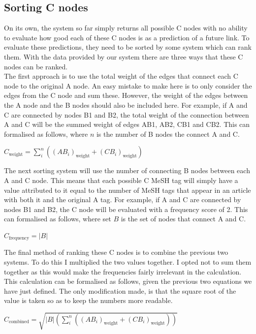 \documentclass{l4proj}
\begin{document}
\subsection{Sorting C nodes}

On its own, the system so far simply returns all possible C nodes with no ability to evaluate how good each of these C nodes is as a prediction of a future link. To evaluate these predictions, they need to be sorted by some system which can rank them. With the data provided by our system there are three ways that these C nodes can be ranked. \\

The first approach is to use the total weight of the edges that connect each C node to the original A node. An easy mistake to make here is to only consider the edges from the C node and sum these. However, the weight of the edges between the A node and the B nodes should also be included here. For example, if A and C are connected by nodes B1 and B2, the total weight of the connection between A and C will be the summed weight of edges AB1, AB2, CB1 and CB2. This can formalised as follows, where $n$ is the number of B nodes the connect A and C.
\begin{center}
    $C_{\text{weight}} = \sum_i^n ((AB_i)_{\text{weight}} + (CB_i)_{\text{weight}})$ \\
\end{center}

The next sorting system will use the number of connecting B nodes between each A and C node. This means that each possible C MeSH tag will simply have a value attributed to it equal to the number of MeSH tags that appear in an article with both it and the original A tag. For example, if A and C are connected by nodes B1 and B2, the C node will be evaluated with a frequency score of 2. This can formalised as follows, where set $B$ is the set of nodes that connect A and C.
\begin{center}
    $C_{\text{frequency}} = |B| $\\
\end{center}

The final method of ranking these C nodes is to combine the previous two systems. To do this I multiplied the two values together. I opted not to sum them together as this would make the frequencies fairly irrelevant in the calculation. This calculation can be formalised as follows, given the previous two equations we have just defined. The only modification made, is that the square root of the value is taken so as to keep the numbers more readable.
\begin{center}
    $C_{\text{combined}} = \sqrt{|B|(\sum_i^n ((AB_i)_{\text{weight}} + (CB_i)_{\text{weight}}))}$\\
\end{center}
\end{document}
